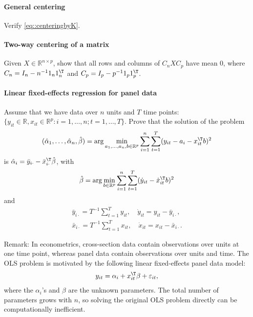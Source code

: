 


\paragraph{General centering}\label{hw7::general-centering}

Verify \eqref{eq::centeringbyK}. 




\paragraph{Two-way centering of a matrix}\label{hw7::2way-centering}


Given $X \in \mathbb{R}^{n\times p}$, show that all rows and columns of $ C_n X C_p $ have mean $0$, where $C_n = I_n - n^{-1} 1_n 1_n^{\T}$ and  $C_p = I_p - p^{-1} 1_p 1_p^{\T}$. 





\paragraph{Linear fixed-effects regression for panel data}
\label{hw7::lfe-panel}

Assume that we have data over $n$ units and $T$ time points: $\{ y_{it} \in \mathbb{R}, x_{it} \in \mathbb{R}^p : i=1, \ldots, n; t = 1, \ldots, T \}$. Prove that the solution of the problem
$$
(\hat{\alpha}_1, \ldots, \hat{\alpha}_n, \hat{\beta})
= \arg\min_{a_1, \ldots, a_n, b\in \mathbb{R}^p} \sum_{i=1}^n \sum_{t=1}^T
( y_{it} - a_i  - x_{it}^{\T} b )^2
$$
is $\hat{\alpha}_i = \bar{y}_{i\cdot} - \bar{x}_{i\cdot}^{\T} \hat{\beta}$, with 
$$
\hat{\beta} = \arg\min_{  b\in \mathbb{R}^p } \sum_{i=1}^n \sum_{t=1}^T
( \dot{y}_{it} -  \dot{x}_{it}^{\T} b )^2
$$
and 
\begin{eqnarray*}
\bar{y}_{i \cdot}  = T^{-1} \sum_{t=1}^T y_{it}, \quad
\dot{y}_{it} = y_{it} - \bar{y}_{i\cdot}, \\ 
\bar{x}_{i\cdot} =  T^{-1} \sum_{t=1}^T x_{it}, \quad
\dot{x}_{it} = x_{it} - \bar{x}_{i\cdot}.
\end{eqnarray*}




Remark: In econometrics, cross-section data contain observations over units at one time point, whereas panel data contain observations over units and time. The OLS problem is motivated by the following linear fixed-effects  panel data model:
$$
y_{it} = \alpha_i + x_{it}^{\T} \beta + \varepsilon_{it},
$$
where the $\alpha_i$'s and $\beta$ are the unknown parameters. The total number of parameters grows with $n$, so solving the original OLS problem directly can be computationally inefficient. 




